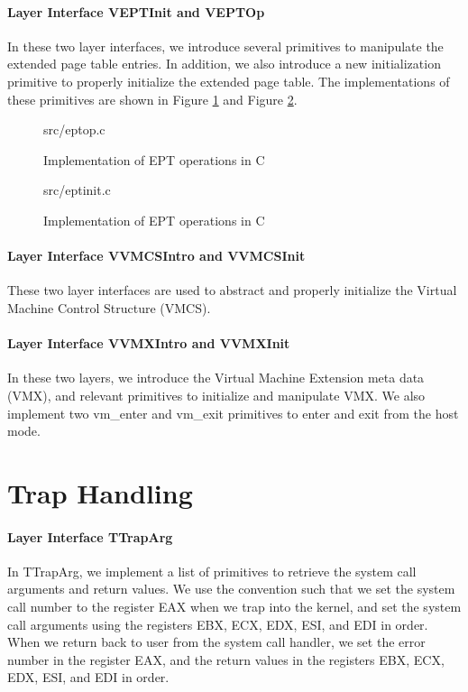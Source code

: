 \paragraph{Layer Interface VEPTInit and VEPTOp}

In these two layer interfaces, we introduce several primitives to manipulate the extended page table entries.
In addition, we also introduce a new initialization primitive to properly initialize the extended page
table. The implementations of these primitives are shown in Figure \ref{fig:eptop_c} and
Figure \ref{fig:eptinit_c}.

\begin{figure}
	 {src/eptop.c}
	\caption{Implementation of EPT operations in C}
	\label{fig:eptop_c}
\end{figure}

\begin{figure}
	 {src/eptinit.c}
	\caption{Implementation of EPT operations in C}
	\label{fig:eptinit_c}
\end{figure}

\paragraph{Layer Interface VVMCSIntro and VVMCSInit}

These two layer interfaces are used to abstract and properly initialize the Virtual Machine Control Structure (VMCS).

\paragraph{Layer Interface VVMXIntro and VVMXInit}

In these two layers, we introduce the Virtual Machine Extension meta data (VMX), and relevant primitives to initialize
and manipulate VMX. We also implement two \textsf{vm\_enter} and \textsf{vm\_exit} primitives to enter and exit
from the host mode.

\section{Trap Handling}

\paragraph{Layer Interface TTrapArg}

In TTrapArg, we implement a list of primitives to retrieve the system call arguments and return values.
We use the convention such that we set the system call number to the register \textsf{EAX} when we trap into the kernel,
and set the system call arguments using the registers \textsf{EBX}, \textsf{ECX}, \textsf{EDX}, \textsf{ESI}, and \textsf{EDI}
in order. When we return back to user from the system call handler, we set the error number in the register \textsf{EAX},
and the return values in the registers \textsf{EBX}, \textsf{ECX}, \textsf{EDX}, \textsf{ESI}, and \textsf{EDI}
in order.

